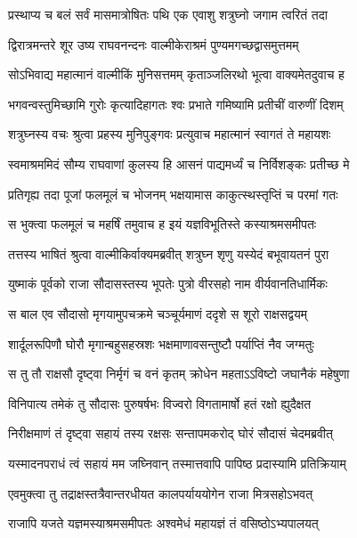 
\twolineshloka
{प्रस्थाप्य च बलं सर्वं मासमात्रोषितः पथि}
{एक एवाशु शत्रुघ्नो जगाम त्वरितं तदा} %

\twolineshloka
{द्विरात्रमन्तरे शूर उष्य राघवनन्दनः}
{वाल्मीकेराश्रमं पुण्यमगच्छद्वासमुत्तमम्} %

\twolineshloka
{सोऽभिवाद्य महात्मानं वाल्मीकिं मुनिसत्तमम्}
{कृताञ्जलिरथो भूत्वा वाक्यमेतदुवाच ह} %

\twolineshloka
{भगवन्वस्तुमिच्छामि गुरोः कृत्यादिहागतः}
{श्वः प्रभाते गमिष्यामि प्रतीचीं वारुणीं दिशम्} %

\twolineshloka
{शत्रुघ्नस्य वचः श्रुत्वा प्रहस्य मुनिपुङ्गवः}
{प्रत्युवाच महात्मानं स्वागतं ते महायशः} %

\twolineshloka
{स्वमाश्रममिदं सौम्य राघवाणां कुलस्य हि}
{आसनं पाद्यमर्ध्यं च निर्विशङ्कः प्रतीच्छ मे} %

\twolineshloka
{प्रतिगृह्य तदा पूजां फलमूलं च भोजनम्}
{भक्षयामास काकुत्स्थस्तृप्तिं च परमां गतः} %

\twolineshloka
{स भुक्त्वा फलमूलं च महर्षिं तमुवाच ह}
{इयं यज्ञविभूतिस्ते कस्याश्रमसमीपतः} %

\twolineshloka
{तत्तस्य भाषितं श्रुत्वा वाल्मीकिर्वाक्यमब्रवीत्}
{शत्रुघ्न शृणु यस्येदं बभूवायतनं पुरा} %

\twolineshloka
{युष्माकं पूर्वको राजा सौदासस्तस्य भूपतेः}
{पुत्रो वीरसहो नाम वीर्यवानतिधार्मिकः} %

\twolineshloka
{स बाल एव सौदासो मृगयामुपचक्रमे}
{चञ्चूर्यमाणं ददृशे स शूरो राक्षसद्वयम्} %

\twolineshloka
{शार्दूलरूपिणौ घोरौ मृगान्बहुसहस्रशः}
{भक्षमाणावसन्तुष्टौ पर्याप्तिं नैव जग्मतुः} %

\twolineshloka
{स तु तौ राक्षसौ दृष्ट्वा निर्मृगं च वनं कृतम्}
{क्रोधेन महताऽऽविष्टो जघानैकं महेषुणा} %

\twolineshloka
{विनिपात्य तमेकं तु सौदासः पुरुषर्षभः}
{विज्वरो विगतामार्षो हतं रक्षो ह्युदैक्षत} %

\twolineshloka
{निरीक्षमाणं तं दृष्ट्वा सहायं तस्य रक्षसः}
{सन्तापमकरोद् घोरं सौदासं चेदमब्रवीत्} %

\twolineshloka
{यस्मादनपराधं त्वं सहायं मम जघ्निवान्}
{तस्मात्तवापि पापिष्ठ प्रदास्यामि प्रतिक्रियाम्} %

\twolineshloka
{एवमुक्त्वा तु तद्राक्षस्तत्रैवान्तरधीयत}
{कालपर्याययोगेन राजा मित्रसहोऽभवत्} %

\twolineshloka
{राजापि यजते यज्ञमस्याश्रमसमीपतः}
{अश्वमेधं महायज्ञं तं वसिष्ठोऽभ्यपालयत्} %

